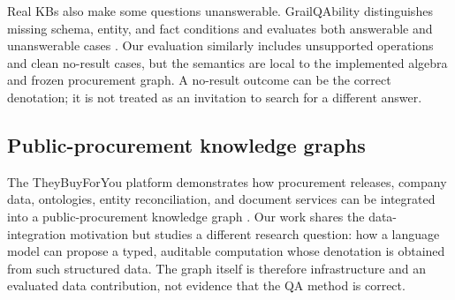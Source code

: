 Real KBs also make some questions unanswerable.  GrailQAbility distinguishes missing schema,
entity, and fact conditions and evaluates both answerable and unanswerable cases
\citep{patidar-etal-2023-grailqability}.  Our evaluation similarly includes unsupported
operations and clean no-result cases, but the semantics are local to the implemented algebra and
frozen procurement graph.  A no-result outcome can be the correct denotation; it is not treated
as an invitation to search for a different answer.

\subsection{Public-procurement knowledge graphs}

The TheyBuyForYou platform demonstrates how procurement releases, company data, ontologies,
entity reconciliation, and document services can be integrated into a public-procurement
knowledge graph \citep{distinto2022theybuyforyou}.  Our work shares the data-integration
motivation but studies a different research question: how a language model can propose a typed,
auditable computation whose denotation is obtained from such structured data.  The graph itself
is therefore infrastructure and an evaluated data contribution, not evidence that the QA method
is correct.
